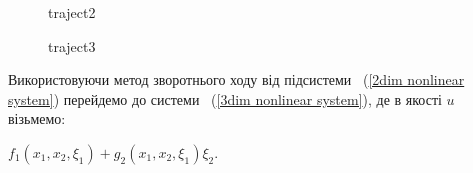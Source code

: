 \documentclass{article}
\begin{document}
\begin{figure}[]
    \caption{traject2}
    \label{fig:image2}
\end{figure}

\begin{figure}[]
    \caption{traject3}
    \label{fig:image3}
\end{figure}

\pagebreak

Використовуючи метод зворотнього ходу від підсистеми ~(\ref{2dim nonlinear system}) 
перейдемо до системи   ~(\ref{3dim nonlinear system}), де  в якості $u$ візьмемо:

$f_1(x_1,x_2,\xi_1)+g_2(x_1,x_2,\xi_1)\xi_2$.
\end{document}
